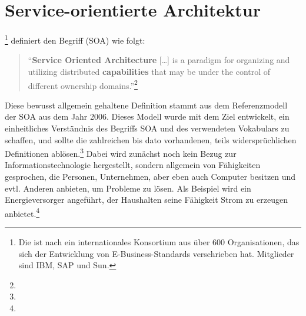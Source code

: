 \section{Service-orientierte Architektur}
\footnote{Die  ist nach  ein internationales Konsortium aus über 600 Organisationen, das sich der Entwicklung von E-Business-Standards verschrieben hat. Mitglieder sind \zB IBM, SAP und Sun.} definiert den Begriff  (SOA) wie folgt:
\begin{quote}
"`\textbf{Service Oriented Architecture} [\ldots] is a paradigm for organizing and utilizing distributed \textbf{capabilities} that may be under the control of different ownership domains."'\footnote{}
\end{quote}
Diese bewusst allgemein gehaltene Definition stammt aus dem Referenzmodell der SOA aus dem Jahr 2006. Dieses Modell wurde mit dem Ziel entwickelt, ein einheitliches Verständnis des Begriffs SOA und des verwendeten Vokabulars zu schaffen, und sollte die zahlreichen bis dato vorhandenen, teils widersprüchlichen Definitionen ablösen.\footnote{\Vgl{}} Dabei wird zunächst noch kein Bezug zur Informationstechnologie hergestellt, sondern allgemein von Fähigkeiten gesprochen, die Personen, Unternehmen, aber eben auch Computer besitzen und evtl. Anderen anbieten, um Probleme zu lösen. Als Beispiel wird ein Energieversorger angeführt, der Haushalten seine Fähigkeit Strom zu erzeugen anbietet.\footnote{\Vgl{}}
